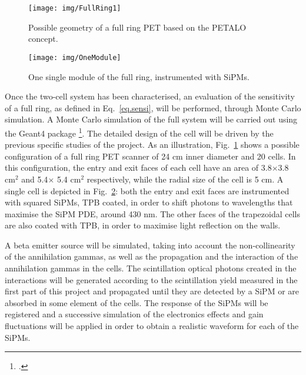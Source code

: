 \begin{figure}[!htb]
	\centering
	\texttt{[image: img/FullRing1]}
	\caption{Possible geometry of a full ring PET based on the PETALO concept.}\label{fig.design}
\end{figure}

\begin{figure}[!htb]
	\centering
	\texttt{[image: img/OneModule]}
	\caption{One single module of the full ring, instrumented with SiPMs.}\label{fig.oneCell}
\end{figure}
%
Once the two-cell system has been characterised, an evaluation of the sensitivity of a full ring, as defined in Eq.~\ref{eq.sensi},  will be performed, through Monte Carlo simulation.
A Monte Carlo simulation of the full system will be carried out using the Geant4 package \footcite{Agostinelli:2002hh, Allison:2006ve}. The detailed design of the cell will be driven by the previous specific studies of the project. As an illustration, Fig.~\ref{fig.design} shows a possible configuration of a full ring PET scanner of 24 cm inner diameter and 20 cells. In this configuration, the entry and exit faces of each cell have an area of 3.8$\times$3.8 cm$^2$ and 5.4$\times$ 5.4 cm$^2$ respectively, while the radial size of the cell is 5 cm. A single cell is depicted in Fig.~\ref{fig.oneCell}: both the entry and exit faces are instrumented with squared SiPMs, TPB coated, in order to shift photons to wavelengths that maximise the SiPM PDE, around 430 nm. The other faces of the trapezoidal cells are also coated with TPB, in order to maximise light reflection on the walls.

A beta emitter source will be simulated, taking into account the non-collinearity of the annihilation gammas, as well as the propagation and the interaction of the annihilation gammas in the cells. The scintillation optical photons created in the interactions will be generated according to the scintillation yield measured in the first part of this project and propagated until they are detected by a SiPM or are absorbed in some element of the cells. The response of the SiPMs will be registered and a successive simulation of the electronics effects and gain fluctuations will be applied in order to obtain a realistic waveform for each of the SiPMs.

